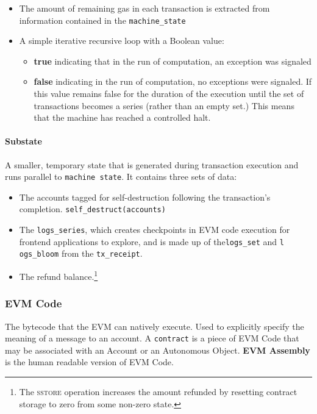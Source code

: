 \documentclass[10pt,letterpaper,leqno,bibliography=totoc]{scrartcl}
\newenvironment{alphafootnotes}
{\par\edef\savedfootnotenumber{\number\value{footnote}}
\renewcommand{\thefootnote}{\alph{footnote}}
\setcounter{footnote}{0}}
{\par\setcounter{footnote}{\savedfootnotenumber}}
\begin{document}
\begin{alphafootnotes}
\begin{multicols*}{2}
		\begin{itemize}
			\item The amount of remaining gas in each transaction is extracted from information contained in the \texttt{machine\_state} 
			\item A simple iterative recursive  loop\supercite{Wood2017} with a Boolean value: 
		\begin{itemize}
				\item\textbf{true} indicating that in the run of computation, an exception was signaled
				\item\textbf{false} indicating in the run of computation, no exceptions were signaled. If this value remains false for the duration of the execution until the set of transactions becomes a series (rather than an empty set.) This means that the machine has reached a controlled halt. 
			\end{itemize}
		\end{itemize}

				\paragraph{Substate}
				
				 A smaller, temporary state that is generated during transaction execution and runs parallel to \texttt{machine state}. It contains three sets of data:
				
				\begin{itemize}
					\item The accounts tagged for self-destruction following the transaction's completion. \texttt{self\_destruct(accounts)}
					\item The \texttt{logs\_series}, which creates checkpoints in EVM code execution for frontend applications to explore, and is made up of the\texttt{logs\_set} and \texttt{l
						ogs\_bloom} from the \texttt{tx\_receipt}.
					\item The refund balance.\footnote{The \textsc{sstore} operation increases the amount refunded by resetting contract storage to zero from some non-zero state.}
				\end{itemize}
				

			\subsubsection{EVM Code}
				The bytecode that the EVM can natively execute. Used to explicitly specify the meaning of a message to an account. A \texttt{contract} is a piece of EVM Code that may be associated with an Account or an Autonomous Object. \textbf{EVM Assembly} is the human readable version of EVM Code.

\end{multicols*}
\end{alphafootnotes}
\end{document}
